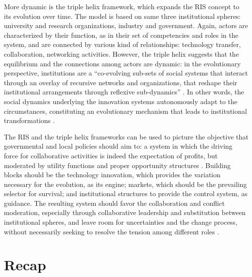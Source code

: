 More dynamic is the triple helix framework, which expands the RIS concept to its evolution over time. The model is based on same three  institutional spheres: university and research organizations, industry and government. Again, actors are characterized by their function, as in their set of competencies and roles in the system, and are connected by various kind of relationships: technology transfer, collaboration, networking activities. However, the triple helix suggests that the equilibrium and the connections among actors are dynamic: in the evolutionary perspective, institutions are a \enquote{co-evolving sub-sets of social systems that interact through an overlay of recursive networks and organizations, that reshape their institutional arrangements through reflexive sub-dynamics} \citep{Ranga2013}. In other words, the social dynamics underlying the innovation systems autonomously adapt to the circumstances, constituting an evolutionary mechanism that leads to institutional transformations \citep{Etzkowitz2000}.

The RIS and the triple helix frameworks can be used to picture the objective that governmental and local policies should aim to: a system in which the driving force for collaborative activities is indeed the expectation of profits, but moderated by utility functions and proper opportunity structures \citep{Etzkowitz2000}. Building blocks should be the technology innovation, which provides the variation necessary for the evolution, as its engine; markets, which should be the prevailing selector for survival; and institutional structures to provide the control system, as guidance. The resulting system should favor the collaboration and conflict moderation, especially through collaborative leadership and substitution between institutional spheres, and leave room for uncertainties and the change process, without necessarily seeking to resolve the tension among different roles \citep{Ranga2013}. 

\section{Recap}
